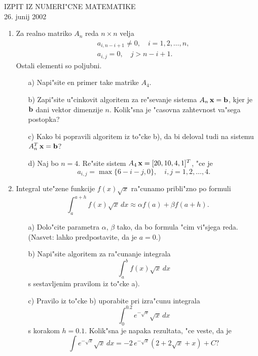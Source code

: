 
\begin{center}
  IZPIT IZ NUMERI"CNE MATEMATIKE\\
  26. junij 2002
\end{center}

\begin{enumerate}

  \item Za realno matriko $A_n$ reda $n\times n$ velja
    \begin{eqnarray*}
      &&a_{i,n-i+1}\neq 0, \quad i=1,2,\dots,n,\\
      &&a_{i,j}=0, \quad j>n-i+1.
    \end{eqnarray*}
    Ostali elementi so poljubni.
    \begin{itemize}
      \item[a)] Napi"site en primer take matrike $A_4$.
      \item[b)] Zapi"site u"cinkovit algoritem za re"sevanje sistema
        $A_n\,\mathbf{x}=\mathbf{b}$, kjer je $\mathbf{b}$ dani vektor dimenzije $n$.
        Kolik"sna je "casovna zahtevnost va"sega postopka?
      \item[c)] Kako bi popravili algoritem iz to"cke b), da bi deloval
        tudi na sistemu $A_n^T\,\mathbf{x}=\mathbf{b}$?
      \item[d)] Naj bo $n=4$. Re"site sistem $A_4\,\mathbf{x}=[20,10,4,1]^T$, 
        "ce je
        $$a_{i,j}=\max\{6-i-j,0\},\quad i,j=1,2,\dots,4.$$
    \end{itemize}

  \item Integral ute"zene funkcije $f(x)\sqrt{x}$ ra"cunamo pribli"zno
    po formuli
    $$\int_{a}^{a+h} f(x)\sqrt{x}\,dx\approx \alpha f(a)+\beta f(a+h).$$
    \begin{itemize}
      \item[a)] Dolo"cite parametra $\alpha$, $\beta$ tako, da bo
      formula "cim vi"sjega reda. (Nasvet: lahko predpostavite, da je $a=0$.)
      \item[b)] Napi"site algoritem za ra"cunanje integrala
        $$\int_{a}^b f(x)\sqrt{x}\,dx$$
        s sestavljenim pravilom iz to"cke a).
      \item[c)] Pravilo iz to"cke b) uporabite pri izra"cunu integrala
        $$\int_0^{0.2}e^{-\sqrt{x}}\sqrt{x}\,dx$$
        s korakom $h=0.1$.
        Kolik"sna je napaka rezultata, "ce veste, da je
        $$\int e^{-\sqrt{x}}\sqrt{x}\,dx=
        -2\,e^{-\sqrt{x}}(2+2\sqrt{x}+x)+C?$$
     \end{itemize}
\end{enumerate}


